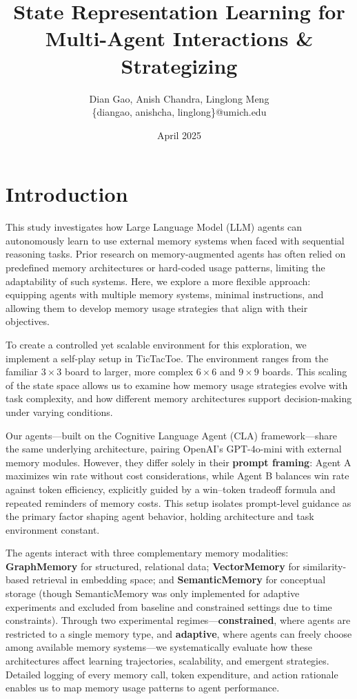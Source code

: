 \documentclass[10pt]{article}
\title{State Representation Learning for Multi-Agent Interactions \& Strategizing}
\author{Dian Gao, Anish Chandra, Linglong Meng\\[0.8em]
\large{\color{professonalblue}\{diangao, anishcha, linglong\}@umich.edu}}
\date{April 2025}
\begin{document}
\maketitle
\thispagestyle{firstpage}

\section{Introduction}

This study investigates how Large Language Model (LLM) agents can autonomously learn to use external memory systems when faced with sequential reasoning tasks. Prior research on memory-augmented agents has often relied on predefined memory architectures or hard-coded usage patterns, limiting the adaptability of such systems. Here, we explore a more flexible approach: equipping agents with multiple memory systems, minimal instructions, and allowing them to develop memory usage strategies that align with their objectives.

To create a controlled yet scalable environment for this exploration, we implement a self-play setup in TicTacToe. The environment ranges from the familiar $3 \times 3$ board to larger, more complex $6 \times 6$ and $9 \times 9$ boards. This scaling of the state space allows us to examine how memory usage strategies evolve with task complexity, and how different memory architectures support decision-making under varying conditions.

Our agents—built on the Cognitive Language Agent (CLA) framework—share the same underlying architecture, pairing OpenAI's GPT-4o-mini with external memory modules. However, they differ solely in their \textbf{prompt framing}: Agent A maximizes win rate without cost considerations, while Agent B balances win rate against token efficiency, explicitly guided by a win–token tradeoff formula and repeated reminders of memory costs. This setup isolates prompt-level guidance as the primary factor shaping agent behavior, holding architecture and task environment constant.

The agents interact with three complementary memory modalities: \textbf{GraphMemory} for structured, relational data; \textbf{VectorMemory} for similarity-based retrieval in embedding space; and \textbf{SemanticMemory} for conceptual storage (though SemanticMemory was only implemented for adaptive experiments and excluded from baseline and constrained settings due to time constraints). Through two experimental regimes—\textbf{constrained}, where agents are restricted to a single memory type, and \textbf{adaptive}, where agents can freely choose among available memory systems—we systematically evaluate how these architectures affect learning trajectories, scalability, and emergent strategies. Detailed logging of every memory call, token expenditure, and action rationale enables us to map memory usage patterns to agent performance.
\end{document}
